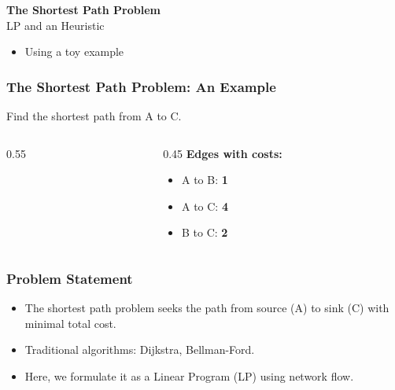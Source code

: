 \documentclass{beamer}
\begin{document}
\begin{frame}
  \begin{center}
    \Huge{\textbf{The Shortest Path Problem}} \\[1em]
    \Large{LP and an Heuristic} \\[1em]
    \vspace{1cm}
  \end{center}
  \begin{itemize}
    \item Using a toy example
  \end{itemize}
\end{frame}


\begin{frame}
\frametitle{The Shortest Path Problem: An Example}
Find the shortest path from A to C.

\vspace{0.3cm}
\begin{columns}[c]
\begin{column}{0.55\textwidth}
\centering
{}
\end{column}

\begin{column}{0.45\textwidth}
\textbf{Edges with costs:}
\begin{itemize}
  \item A to B: \textbf{1}
  \item A to C: \textbf{4}
  \item B to C: \textbf{2}
\end{itemize}
\end{column}
\end{columns}
\end{frame}

\begin{frame}
\frametitle{Problem Statement}
\begin{itemize}
    \item The shortest path problem seeks the path from source (A) to sink (C) with minimal total cost.
    \item Traditional algorithms: Dijkstra, Bellman-Ford.
    \item Here, we formulate it as a Linear Program (LP) using network flow.
\end{itemize}
\end{frame}
\end{document}
